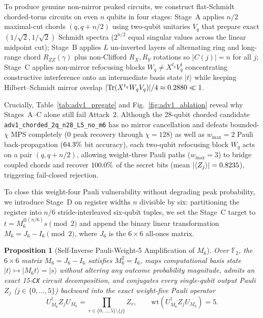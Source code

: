 \documentclass[aps,prapplied,reprint,longbibliography]{revtex4-2}
\newtheorem{proposition}{Proposition}
\begin{document}
To produce genuine non-mirror peaked circuits, we construct flat-Schmidt chorded-torus circuits on even $n$ qubits in four stages: Stage~A applies $n/2$ maximal-cut chords $(q, q+n/2)$ using two-qubit unitaries $V_q$ that prepare exact $(1/\sqrt{2}, 1/\sqrt{2})$ Schmidt spectra ($2^{n/2}$ equal singular values across the linear midpoint cut); Stage~B applies $L$ un-inverted layers of alternating ring and long-range chord $R_{ZZ}(\gamma)$ plus non-Clifford $R_X, R_Y$ rotations so $|C(j)|=n$ for all $j$; Stage~C applies non-mirror refocusing blocks $W_q \ne X^{t_q} V_q^\dagger$ concentrating constructive interference onto an intermediate basis state $|t\rangle$ while keeping Hilbert--Schmidt mirror overlap $|\mathrm{Tr}(X^{t_q} W_q V_q)|/4 \approx 0.2880{} \ll 1$.

Crucially, Table~\ref{tab:adv1_pregate} and Fig.~\ref{fig:adv1_ablation} reveal why Stages~A--C alone still fail Attack~2. Although the 28-qubit chorded candidate \texttt{adv1\_chorded\_2q\_n28\_L5\_no\_m6} has no mirror cancellation and defeats bounded-$\chi$ MPS completely ($0$ peak recovery through $\chi=128$) as well as $w_{\max}=2$ Pauli back-propagation ($64.3{}\%$ bit accuracy), each two-qubit refocusing block $W_q$ acts on a pair $(q, q+n/2)$, allowing weight-three Pauli paths ($w_{\max}=3$) to bridge coupled chords and recover $100.0{}\%$ of the secret bits (mean $|\langle Z_j \rangle| = 0.8235{}$), triggering fail-closed rejection.

To close this weight-four Pauli vulnerability without degrading peak probability, we introduce Stage~D on register widths $n$ divisible by six: partitioning the register into $n/6$ stride-interleaved six-qubit tuples, we set the Stage~C target to $t = M_6^{\oplus (n/6)} s \pmod 2$ and append the binary linear transformation $M_6 = J_6 - I_6 \pmod 2$, where $J_6$ is the $6\times 6$ all-ones matrix.

\begin{proposition}[Self-Inverse Pauli-Weight-5 Amplification of $M_6$]
\label{prop:m6}
Over $\mathbb{F}_2$, the $6\times 6$ matrix $M_6 = J_6 - I_6$ satisfies $M_6^2 = I_6$, maps computational basis state $|t\rangle \mapsto |M_6 t\rangle = |s\rangle$ without altering any outcome probability magnitude, admits an exact 15-\texttt{CX} circuit decomposition, and conjugates every single-qubit output Pauli $Z_j$ ($j \in \{0,\dots,5\}$) backward into the exact weight-five Pauli operator
\begin{equation}
U_{M_6}^\dagger Z_j U_{M_6} = \prod_{r \in \{0,\dots,5\} \setminus \{j\}} Z_r, \qquad \mathrm{wt}\!\left(U_{M_6}^\dagger Z_j U_{M_6}\right) = 5.
\label{eq:m6_pauli5}
\end{equation}
\end{proposition}
\end{document}

